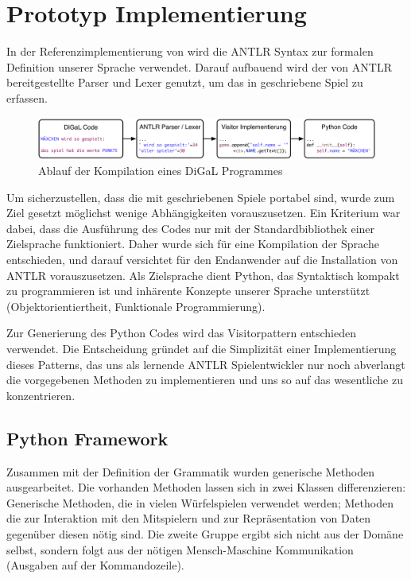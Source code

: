 
\chapter{Prototyp Implementierung}
\label{cha:implementierung}
In der Referenzimplementierung von \dg wird die ANTLR Syntax zur formalen Definition unserer Sprache verwendet. Darauf aufbauend wird der von ANTLR bereitgestellte Parser und Lexer genutzt, um das in \dg geschriebene Spiel zu erfassen.\\

\begin{figure}[ht]
	\centering
	\includegraphics[width=\textwidth]{Flow.pdf}
	\caption{Ablauf der Kompilation eines DiGaL Programmes}
	\label{flow}
\end{figure}

Um sicherzustellen, dass die mit \dg geschriebenen Spiele portabel sind, wurde zum Ziel gesetzt möglichst wenige Abhängigkeiten vorauszusetzen. Ein Kriterium war dabei, dass die Ausführung des Codes nur mit der Standardbibliothek einer Zielsprache funktioniert. Daher wurde sich für eine Kompilation der Sprache entschieden, und darauf versichtet für den Endanwender auf die Installation von ANTLR vorauszusetzen. Als Zielsprache dient Python, das Syntaktisch kompakt zu programmieren ist und inhärente Konzepte unserer Sprache unterstützt (Objektorientiertheit, Funktionale Programmierung).

Zur Generierung des Python Codes wird das Visitorpattern entschieden verwendet. Die Entscheidung gründet auf die Simplizität einer Implementierung dieses Patterns, das uns als lernende ANTLR Spielentwickler nur noch abverlangt die vorgegebenen Methoden zu implementieren und uns so auf das wesentliche zu konzentrieren. 

\section{Python Framework}
\label{sec:python_framework}
	Zusammen mit der Definition der Grammatik wurden generische Methoden ausgearbeitet. Die vorhanden Methoden lassen sich in zwei Klassen differenzieren: Generische Methoden, die in vielen Würfelspielen verwendet werden; Methoden die zur Interaktion mit den Mitspielern und zur Repräsentation von Daten gegenüber diesen nötig sind. Die zweite Gruppe ergibt sich nicht aus der Domäne selbst, sondern folgt aus der nötigen Mensch-Maschine Kommunikation (Ausgaben auf der Kommandozeile).

